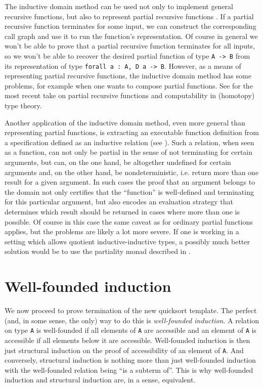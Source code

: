 \documentclass[declaration,mgr,english,shortabstract]{iithesis}
\newcommand{\m}[1]{\texttt{#1}}
\begin{document}
The inductive domain method can be used not only to implement general recursive functions, but also to represent partial recursive functions \cite{BCM8}. If a partial recursive function terminates for some input, we can construct the corresponding call graph and use it to run the function's representation. Of course in general we won't be able to prove that a partial recursive function terminates for all inputs, so we won't be able to recover the desired partial function of type \m{A -> B} from its representation of type \m{forall a\ :\ A, D a -> B}. However, as a means of representing partial recursive functions, the inductive domain method has some problems, for example when one wants to compose partial functions. See \cite{Knapp} for the most recent take on partial recursive functions and computability in (homotopy) type theory.

Another application of the inductive domain method, even more general than representing partial functions, is extracting an executable function definition from a specification defined as an inductive relation (see \cite{Function}). Such a relation, when seen as a function, can not only be partial in the sense of not terminating for certain arguments, but can, on the one hand, be altogether undefined for certain arguments and, on the other hand, be nondeterministic, i.e. return more than one result for a given argument. In such cases the proof that an argument belongs to the domain not only certifies that the ``function'' is well-defined and terminating for this particular argument, but also encodes an evaluation strategy that determines which result should be returned in cases where more than one is possible. Of course in this case the same caveat as for ordinary partial functions applies, but the problems are likely a lot more severe. If one is working in a setting which allows quotient inductive-inductive types, a possibly much better solution would be to use the partiality monad described in \cite{PartialityMonad}.

\section{Well-founded induction} \label{wellfounded}

We now proceed to prove termination of the new quicksort template. The perfect (and, in some sense, the only) way to do this is \textit{well-founded induction}. A relation on type \m{A} is well-founded if all elements of \m{A} are accessible and an element of \m{A} is accessible if all elements below it are accessible. Well-founded induction is then just structural induction on the proof of accessibility of an element of \m{A}. And conversely, structural induction is nothing more than just well-founded induction with the well-founded relation being ``is a subterm of''. This is why well-founded induction and structural induction are, in a sense, equivalent.
\end{document}
